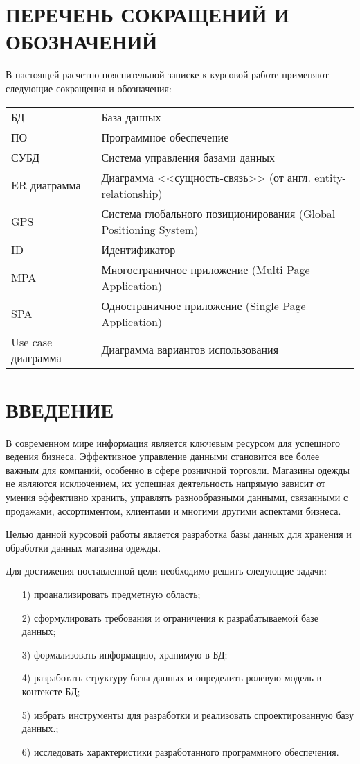 \documentclass{bmstu}
\begin{document}
{\centering \maketableofcontents}

{\centering \chapter*{ПЕРЕЧЕНЬ СОКРАЩЕНИЙ И ОБОЗНАЧЕНИЙ}}

В настоящей расчетно-пояснительной записке к курсовой работе применяют следующие сокращения и обозначения:

\begin{table}[H]
\begin{tabular}{p{5cm}p{10.5cm}}
БД & База данных
\tabularnewline
ПО & Программное обеспечение
\tabularnewline
СУБД & Система управления базами данных
\tabularnewline
ER-диаграмма & Диаграмма <<сущность-связь>> (от англ. entity-relationship)
\tabularnewline
GPS & Система глобального позиционирования (Global Positioning System)
\tabularnewline
ID & Идентификатор
\tabularnewline
MPA & Многостраничное приложение (Multi Page Application)
\tabularnewline
SPA & Одностраничное приложение (Single Page Application)
\tabularnewline
Use case диаграмма & Диаграмма вариантов использования
\tabularnewline
\end{tabular}
\end{table}

{\centering \chapter*{ВВЕДЕНИЕ}}

В современном мире информация является ключевым ресурсом для успешного ведения бизнеса. Эффективное управление данными становится все более важным для компаний, особенно в сфере розничной торговли. Магазины одежды не являются исключением, их успешная деятельность напрямую зависит от умения эффективно хранить, управлять разнообразными данными, связанными с продажами, ассортиментом, клиентами и многими другими аспектами бизнеса.

Целью данной курсовой работы является разработка базы данных для хранения и обработки данных магазина одежды.

Для достижения поставленной цели необходимо решить следующие задачи:
\begin{enumerate}
\item[1)] проанализировать предметную область;
\item[2)] сформулировать требования и ограничения к разрабатываемой базе данных;
\item[3)] формализовать информацию, хранимую в БД;
\item[4)] разработать структуру базы данных и определить ролевую модель в контексте БД;
\item[5)] избрать инструменты для разработки и реализовать спроектированную базу данных.;
\item[6)] исследовать характеристики разработанного программного обеспечения.
\end{enumerate}
\end{document}
